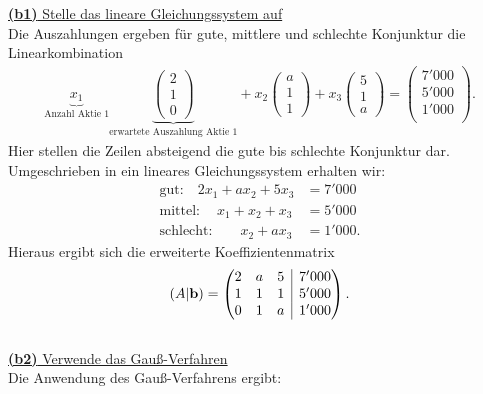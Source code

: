 \underline{\textbf{(b1)} Stelle das lineare Gleichungssystem auf}\\
Die Auszahlungen ergeben für gute, mittlere und schlechte Konjunktur die Linearkombination
\begin{align*}
	\underbrace{x_1}_{\textrm{Anzahl Aktie 1}}
	\underbrace{\begin{pmatrix}
		2 \\ 1 \\ 0
	\end{pmatrix}}_{\textrm{erwartete Auszahlung  Aktie 1}}
	+
	x_2 
	\begin{pmatrix}
		a \\ 1 \\ 1
	\end{pmatrix}
	+
	x_3
	\begin{pmatrix}
		5 \\ 1 \\ a
	\end{pmatrix}
	= 
	\begin{pmatrix}
		7'000\\
		5'000\\
		1'000\\
	\end{pmatrix}.
\end{align*}
Hier stellen die Zeilen absteigend die gute bis schlechte Konjunktur dar. Umgeschrieben in ein lineares Gleichungssystem erhalten wir:
\begin{align*}
	\textrm{gut:} \quad 2 x_1 + a x_2 + 5 x_3 &= 7'000\\
	\textrm{mittel:} \quad  \ x_1 + x_2 + x_3  &= 5'000\\
	\textrm{schlecht: } \quad \ \ \ x_2 + a x_3 &= 1'000.
\end{align*}
Hieraus ergibt sich die erweiterte Koeffizientenmatrix
\begin{align*}
	(A | \mathbf{b})
	=
	\begin{pmatrix}
		2 & a & 5 & \BAR & 7'000\\
		1 & 1 & 1 & \BAR & 5'000\\
		0 & 1 & a & \BAR & 1'000
	\end{pmatrix}.
\end{align*}
\ \\
\underline{\textbf{(b2)} Verwende das Gauß-Verfahren}\\
Die Anwendung des Gauß-Verfahrens ergibt:
